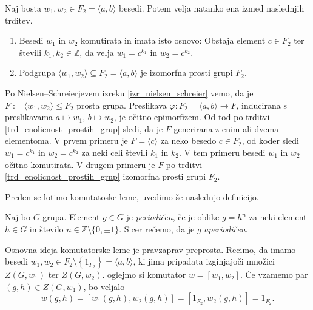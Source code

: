 

\begin{lema}
\label{lem_posledica_nielsen_schreier}
Naj bosta $w_1, w_2 \in F_2 = \langle a, b \rangle$ besedi. Potem velja natanko ena izmed naslednjih trditev. \begin{enumerate}
    \item Besedi $w_1$ in $w_2$ komutirata in imata isto osnovo: Obstaja element $c \in F_2$ ter števili $k_1, k_2 \in \mathbb{Z}$, da velja $w_1= c^{k_1}$ in $w_2 = c^{k_2}$. 
    \item Podgrupa $\langle w_1, w_2 \rangle \subseteq F_2 = \langle a, b \rangle$ je izomorfna prosti grupi $F_2$.
\end{enumerate}
\end{lema}
\begin{dokaz}
    Po Nielsen--Schreierjevem izreku \ref{izr_nielsen_schreier} vemo, da je $F:= \langle w_1 , w_2 \rangle \le F_2$ prosta grupa. Preslikava $\varphi : F_2 = \langle a, b \rangle \to F$,
    inducirana s preslikavama $a \mapsto w_1$, $b \mapsto w_2$, je očitno epimorfizem. Od tod po trditvi \ref{trd_enolicnost_prostih_grup} sledi, da je $F$ generirana z enim ali dvema elementoma.
    V prvem primeru je $F = \langle c \rangle$ za neko besedo $c \in F_2$, od koder sledi $w_1= c^{k_1}$ in $w_2 = c^{k_2}$ za neki celi števili $k_1$ in $k_2$. V tem primeru besedi $w_1$ in $w_2$ očitno komutirata.
    V drugem primeru je $F$ po trditvi \ref{trd_enolicnost_prostih_grup} izomorfna prosti grupi $F_2$.
\end{dokaz}
Preden se lotimo komutatoske leme, uvedimo še naslednjo definicijo.
\begin{definicija}\label{def_aperiodicna_beseda}
    Naj bo $G$ grupa. Element $g \in  G$ je \emph{periodičen}, če je oblike $g = h^{n}$ za neki element $h \in G$ in število $n \in \mathbb{Z} \setminus \{ 0, \pm 1 \}$. Sicer rečemo, da je $g$ \emph{aperiodičen}.
    \end{definicija}
Osnovna ideja komutatorske leme je pravzaprav preprosta. Recimo, da imamo besedi $w_1, w_2 \in F_2 \setminus \left\{ 1_{F_2}\right\}  = \langle a,b \rangle$, ki jima pripadata izginjajoči množici $Z(G, w_1)$ ter $Z(G, w_2)$.
oglejmo si komutator $w = [w_1, w_2]$. Če vzamemo par $(g, h) \in Z(G, w_1)$, bo veljalo \begin{equation*}
w(g,h) = [w_1(g,h), w_2(g,h)] = [1_{F_2}, w_2(g,h)] = 1_{F_2}.
\end{equation*}  
